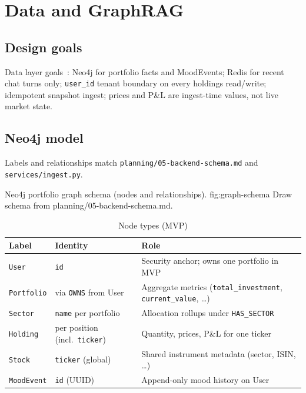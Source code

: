 \chapter{Data and GraphRAG}
\label{ch:database}
\label{ch:graphrag}

\section{Design goals}

Data layer goals~\cite{trd,prd}: Neo4j for portfolio facts and MoodEvents; Redis for recent chat turns only; \texttt{user\_id} tenant boundary on every holdings read/write; idempotent snapshot ingest; prices and P\&L are ingest-time values, not live market state.
\section{Neo4j model}

Labels and relationships match \texttt{planning/05-backend-schema.md} and \texttt{services/ingest.py}.

%
{Neo4j portfolio graph schema (nodes and relationships).}%
{fig:graph-schema}%
{Draw schema from planning/05-backend-schema.md.}

\begin{table}[!htbp]
\centering
\small
\caption{Node types (MVP)}
\label{tab:nodes}
\begin{tabularx}{\textwidth}{@{}
  >{\raggedright\arraybackslash}p{}
  >{\raggedright\arraybackslash}p{}
  >{\raggedright\arraybackslash}X
  @{}}
\toprule
\textbf{Label} & \textbf{Identity} & \textbf{Role} \\
\midrule
\texttt{User} & \texttt{id} & Security anchor; owns one portfolio in MVP \\
\addlinespace
\texttt{Portfolio} & via \texttt{OWNS} from User & Aggregate metrics (\texttt{total\_investment}, \texttt{current\_value}, \ldots) \\
\addlinespace
\texttt{Sector} & \texttt{name} per portfolio & Allocation rollups under \texttt{HAS\_SECTOR} \\
\addlinespace
\texttt{Holding} & per position (incl.\ \texttt{ticker}) & Quantity, prices, P\&L for one ticker \\
\addlinespace
\texttt{Stock} & \texttt{ticker} (global) & Shared instrument metadata (sector, ISIN, \ldots) \\
\addlinespace
\texttt{MoodEvent} & \texttt{id} (UUID) & Append-only mood history on User \\
\bottomrule
\end{tabularx}
\end{table}

